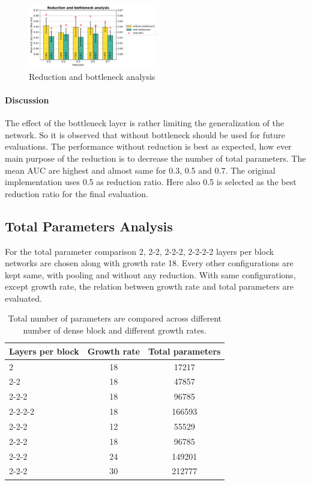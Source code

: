 \begin{figure}[ht]
\centering
\includegraphics[width=0.5\textwidth]{images/densenet/simple/densenet_simple_reduction_bottleneck}
\caption{Reduction and bottleneck analysis}
\label{fig:densenet_simple_reduction_bottleneck}
\end{figure}

\paragraph{Discussion\\}
The effect of the bottleneck layer is rather limiting the generalization of the network. So it is observed that without bottleneck should be used for future evaluations.
The performance without reduction is best as expected, how ever main purpose of the reduction is to decrease the number of total parameters. The mean AUC are highest and almost same for 0.3, 0.5 and 0.7. The original implementation \cite{densenet} 
uses 0.5 as reduction ratio. Here also 0.5 is selected as the best reduction ratio for the final evaluation.

\subsection{Total Parameters Analysis}
For the total parameter comparison 2, 2-2, 2-2-2, 2-2-2-2 layers per block networks are chosen along with growth rate 18. Every other configurations are kept same, with  pooling and without any reduction.
With same configurations, except growth rate, the relation between growth rate and total parameters are evaluated. 

\begin{table}[ht]
\centering
 \caption{Total number of parameters are compared across different number of dense block and different growth rates.}
\begin{tabular}{|l | c | c|} 
 \hline\hline
 \rowcolor{lightgrey}
 Layers per block & Growth rate & Total parameters\\[0.5ex]
 \hline
 2 & 18 & 17217\\
 2-2 & 18 & 47857\\
 2-2-2 & 18 & 96785\\
 2-2-2-2 & 18 & 166593\\
 \hline
 2-2-2 & 12 & 55529\\
2-2-2 & 18 & 96785\\
2-2-2 & 24 & 149201\\
2-2-2 & 30 & 212777\\
 \hline \hline
 \end{tabular}
\label{table:parameter_comparison_dtc}
\end{table}

